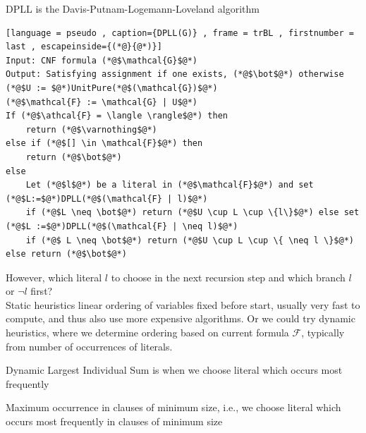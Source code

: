 \documentclass[a4paper]{article}
\theoremstyle{plain}
\theoremstyle{definition}
\newtheorem{defn}{Definition}[section]
\theoremstyle{remark}
\begin{document}
\begin{tcolorbox}[colback=black!3!white,colframe=black!60!white,title=\begin{defn}DPLL Algorithm \label{DPLL Algorithm}\end{defn}]
DPLL is the Davis-Putnam-Logemann-Loveland algorithm
\begin{lstlisting}[language = pseudo , caption={DPLL(G)} , frame = trBL , firstnumber = last , escapeinside={(*@}{@*)}]
Input: CNF formula (*@$\mathcal{G}$@*)
Output: Satisfying assignment if one exists, (*@$\bot$@*) otherwise
(*@$U := $@*)UnitPure(*@$(\mathcal{G})$@*)
(*@$\mathcal{F} := \mathcal{G} | U$@*)
If (*@$\athcal{F} = \langle \rangle$@*) then
	return (*@$\varnothing$@*)
else if (*@$[] \in \mathcal{F}$@*) then
	return (*@$\bot$@*)
else
	Let (*@$l$@*) be a literal in (*@$\mathcal{F}$@*) and set (*@$L:=$@*)DPLL(*@$(\mathcal{F} | l)$@*)
	if (*@$L \neq \bot$@*) return (*@$U \cup L \cup \{l\}$@*) else set (*@$L :=$@*)DPLL(*@$(\mathcal{F} | \neq l)$@*)
	if (*@$ L \neq \bot$@*) return (*@$U \cup L \cup \{ \neq l \}$@*) else return (*@$\bot$@*)
\end{lstlisting}
However, which literal $l$ to choose in the next recursion step and which branch $l$ or $\neg l$ first? \\
Static heuristics linear ordering of variables fixed before start, usually very fast to compute, and thus also use more expensive algorithms. Or we could try dynamic heuristics, where we determine ordering based on current formula $\mathcal{F}$, typically from number of occurrences of literals.
\end{tcolorbox}
\begin{tcolorbox}[colback=black!3!white,colframe=black!60!white,title=\begin{defn}DLIS \label{DLIS}\end{defn}]
Dynamic Largest Individual Sum is when we choose literal which occurs most frequently
\end{tcolorbox}
\begin{tcolorbox}[colback=black!3!white,colframe=black!60!white,title=\begin{defn}MOMS \label{MOMS}\end{defn}]
Maximum occurrence in clauses of minimum size, i.e., we choose literal which occurs most frequently in clauses of minimum size
\end{tcolorbox}
\end{document}
